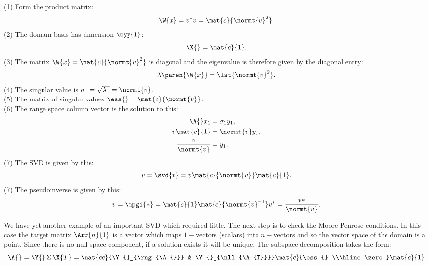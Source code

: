 (1) Form the product matrix:
\begin{equation*}
  \W{x} = v^{*}v = \mat{c}{\normt{v}^{2}}.
\end{equation*}
(2) The domain basis has dimension $\byy{1}$:
\begin{equation*}
  \X{} = \mat{c}{1}.
\end{equation*}
(3) The matrix $\W{x} = \mat{c}{\normt{v}^{2}}$ is diagonal and the eigenvalue is therefore given by the diagonal entry:
\begin{equation}
  \lambda\paren{\W{x}} = \lst{\normt{v}^{2}}.
\end{equation}
(4) The singular value is $\sigma_{1} = \sqrt{\lambda_{1}} = \normt{v}$.\\
(5) The matrix of singular values $\ess{} = \mat{c}{\normt{v}}$.\\
(6) The range space column vector is the solution to this:
\begin{equation*}
  \begin{split}
     \A{}x_{1} &= \sigma_{1} y_{1},\\
     v \mat{c}{1} &= \normt{v} y_{1},\\
     \frac{v}{\normt{v}} &= y_{1}.
  \end{split}
\end{equation*}
(7) The SVD is given by this:
\begin{equation*}
  v = \svd{*} = v \mat{c}{\normt{v}}\mat{c}{1}.
\end{equation*}
(7) The pseudoinverse is given by this:
\begin{equation*}
  v = \mpgi{*} = \mat{c}{1} \mat{c}{\normt{v}^{-1}}v^{*} = \frac{v*}{\normt{v}}.
\end{equation*}

We have yet another example of an important SVD which required little. The next step is to check the Moore-Penrose conditions.
In this case the target matrix $\Arr{n}{1}$ is a vector which maps $1-$vectors (scalars) into $n-$vectors and so the vector space of the domain is a point. Since there is no null space component, if a solution exists it will be unique. The subspace decomposition takes the form:
\begin{equation}
  \A{} = \Y{}\,\Sigma\,\X{T} = 
  \mat{cc}{\Y{}_{\rng{\A{}}} & \Y{}_{\nll{\A{T}}}} 
  \mat{c}{\ess{} \\\hline \zero} 
  \mat{c}{1}
\end{equation}


